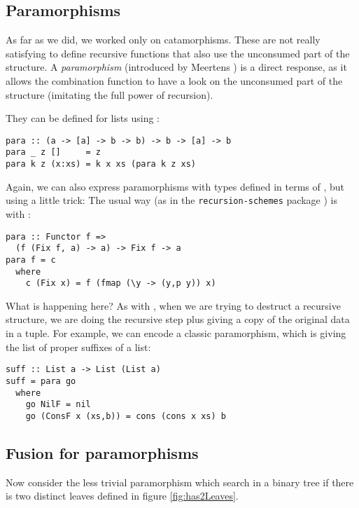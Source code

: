 \subsection{Paramorphisms}
\label{sec:para-list}

As far as we did, we worked only on catamorphisms. These are not really satisfying to define recursive functions that also use the unconsumed part of the structure. A \emph{paramorphism} (introduced by Meertens \cite{Meertens1992}) is a direct response, as it allows the combination function to have a look on the unconsumed part of the structure (imitating the full power of recursion).

They can be defined for lists using :
\begin{verbatim}
para :: (a -> [a] -> b -> b) -> b -> [a] -> b
para _ z []     = z
para k z (x:xs) = k x xs (para k z xs)
\end{verbatim}

Again, we can also express paramorphisms with types defined in terms of , but using a little trick: The usual way (as in the \verb|recursion-schemes| package \cite{ekmett:eschems}) is with :
\begin{verbatim}
para :: Functor f =>
  (f (Fix f, a) -> a) -> Fix f -> a
para f = c
  where
    c (Fix x) = f (fmap (\y -> (y,p y)) x)
\end{verbatim}

\noindent What is happening here? As with , when we are trying to destruct a recursive structure, we are doing the recursive step plus giving a copy of the original data in a tuple.
For example, we can encode a classic paramorphism, which is giving the list of proper suffixes of a list:
\begin{verbatim}
suff :: List a -> List (List a)
suff = para go
  where
    go NilF = nil
    go (ConsF x (xs,b)) = cons (cons x xs) b
\end{verbatim}

\subsection{Fusion for paramorphisms}

Now consider the less trivial paramorphism  which search in a binary tree if there is two distinct leaves defined in figure \ref{fig:has2Leaves}.

